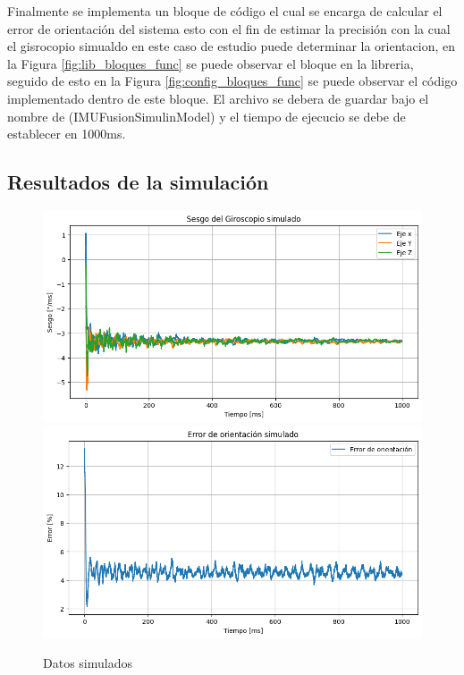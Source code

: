 Finalmente se implementa un bloque de código el cual se encarga de calcular el error de orientación del sistema esto con el fin de estimar la precisión con la cual el gisrocopio simualdo en este caso de estudio puede determinar la orientacion, en la Figura \ref{fig:lib_bloques_func} se puede observar el bloque en la libreria, seguido de esto en la Figura \ref{fig:config_bloques_func} se puede observar el código implementado dentro de este bloque. El archivo se debera de guardar bajo el nombre de (IMUFusionSimulinModel) y el tiempo de ejecucio se debe de establecer en 1000ms. 

\subsection{Resultados de la simulación}\label{subsub:resultados_simulados_IMU}

\begin{figure}[htbp]
    \centering
    \includegraphics[scale=0.3]{fig/Capitulo5/Caso_de_estudio_IMU/data/simulated/sesgo_simulado.png}
    \vspace{1cm}
    \includegraphics[scale=0.3]{fig/Capitulo5/Caso_de_estudio_IMU/data/simulated/error_de_orientacion_simulado.png}
    \caption{Datos simulados}
    \label{fig:data_simulated}
\end{figure}

